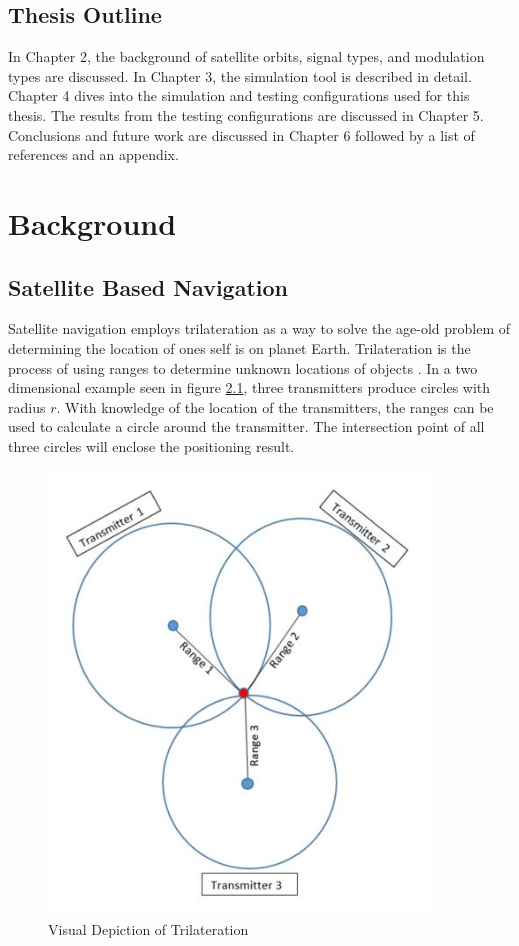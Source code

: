 \documentclass[12pt]{report}
\begin{document}
\section{Thesis Outline}
In Chapter 2, the background of satellite orbits, signal types, and modulation types are discussed. In Chapter 3, the simulation tool is described in detail. Chapter 4 dives into the simulation and testing configurations used for this thesis. The results from the testing configurations are discussed in Chapter 5. Conclusions and future work are discussed in Chapter 6 followed by a list of references and an appendix.


\chapter{Background}

\section{Satellite Based Navigation}\label{sec:satellitenav}
Satellite navigation employs trilateration as a way to solve the age-old problem of determining the location of ones self is on planet Earth. Trilateration is the process of using ranges to determine unknown locations of objects \cite{misraGlobalPositioningSystem2012}. In a two dimensional example seen in figure \ref{fig:Trilateration}, three transmitters produce circles with radius $r$. With knowledge of the location of the transmitters, the ranges can be used to calculate a circle around the transmitter. The intersection point of all three circles will enclose the positioning result.

\begin{figure}[h]
    \centering
    \includegraphics[width=4.0in]{Trilateration.JPG}
    \caption{Visual Depiction of Trilateration}
    \label{fig:Trilateration}
\end{figure}
\end{document}
